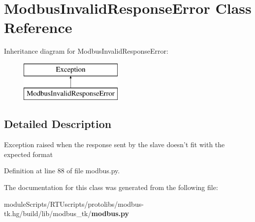 \section{Modbus\+Invalid\+Response\+Error Class Reference}
\label{classmodbus__tk_1_1modbus_1_1_modbus_invalid_response_error}
Inheritance diagram for Modbus\+Invalid\+Response\+Error\+:\begin{figure}[H]
\begin{center}
\leavevmode
\includegraphics[height=2.000000cm]{classmodbus__tk_1_1modbus_1_1_modbus_invalid_response_error}
\end{center}
\end{figure}


\subsection{Detailed Description}
\begin{DoxyVerb}Exception raised when the response sent by the slave doesn't fit 
with the expected format
\end{DoxyVerb}
 

Definition at line 88 of file modbus.\+py.



The documentation for this class was generated from the following file\+:\begin{DoxyCompactItemize}
\item 
module\+Scripts/\+R\+T\+Uscripts/protolibs/modbus-\/tk.\+hg/build/lib/modbus\+\_\+tk/{\bf modbus.\+py}\end{DoxyCompactItemize}
